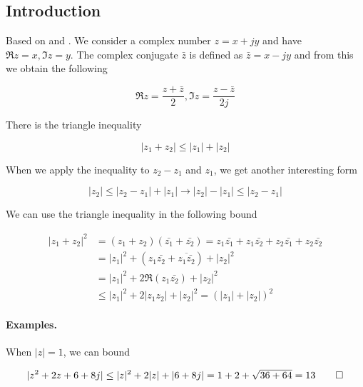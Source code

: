 
\subsection{Introduction}

Based on \cite{agarwal2011complanalysis} and \cite{gamelin2003complex}. We consider a complex number $z = x + jy$ and have $\Re z = x, \Im z = y$. The complex conjugate $\bar{z}$ is defined as $\bar{z} = x - jy$ and from this we obtain the following

\begin{equation*}
\Re z = \frac{z + \bar{z}}{2}, \Im z = \frac{z - \bar{z}}{2j}        
\end{equation*}


There is the triangle inequality

\begin{equation*}
|z_1 + z_2| \leq |z_1| + |z_2|    
\end{equation*}

When we apply the inequality to $z_2 - z_1$ and $z_1$, we get another interesting form

\begin{equation*}
|z_2| \leq |z_2 - z_1| + |z_1| \rightarrow |z_2| - |z_1| \leq |z_2 - z_1|    
\end{equation*}

We can use the triangle inequality in the following bound

\begin{align*}
    |z_1 + z_2|^2 &= (z_1 + z_2)(\bar{z_1} + \bar{z_2}) = z_1 \bar{z_1} + z_1 \bar{z_2} + z_2 \bar{z_1} + z_2 \bar{z_2} \\
    &= |z_1|^2 + (z_1 \bar{z_2} + \overline{z_1 \bar{z_2}} )+ |z_2|^2 \\
    &= |z_1|^2 + 2 \Re (z_1 \bar{z_2}) + |z_2|^2 \\
    &\leq |z_1|^2 + 2 |z_1 z_2| + |z_2|^2 = (|z_1| + |z_2|)^2
\end{align*}

\paragraph{Examples.} When $|z| = 1$, we can bound

\begin{equation*}
|z^2 + 2z + 6 + 8j| \leq |z|^2 + 2 |z| + |6 + 8j| = 1 + 2 + \sqrt{36 + 64} = 13 \qed
\end{equation*}


